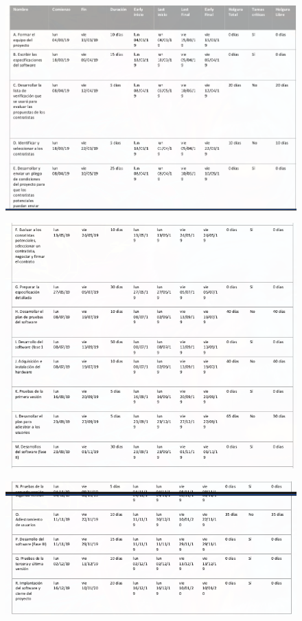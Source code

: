 \documentclass[11pt,letterpaper,onecolumn]{article}
\begin{document}
\begin{figure}[H]
\begin{center}
    \includegraphics[scale=0.6]{informe1.png}
\end{center}
\label{fig:}
\end{figure}
\begin{figure}[H]
\begin{center}
    \includegraphics[scale=1]{informe2.png}
\end{center}
\label{fig:}
\end{figure}
\begin{figure}[H]
\begin{center}
    \includegraphics[scale=1]{informe3.png}
\end{center}
\label{fig:}
\end{figure}
\end{document}
